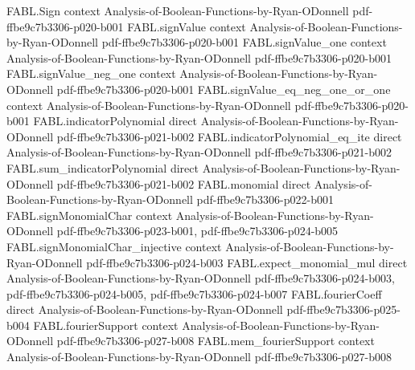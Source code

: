 \begin{theorem}
\label{FABL.fkn}
\leanok
{}
\proofstep
  {FABL.Sign}
  {context}
  {Analysis-of-Boolean-Functions-by-Ryan-ODonnell}
  {pdf-ffbe9c7b3306-p020-b001}
\proofstep
  {FABL.signValue}
  {context}
  {Analysis-of-Boolean-Functions-by-Ryan-ODonnell}
  {pdf-ffbe9c7b3306-p020-b001}
\proofstep
  {FABL.signValue_one}
  {context}
  {Analysis-of-Boolean-Functions-by-Ryan-ODonnell}
  {pdf-ffbe9c7b3306-p020-b001}
\proofstep
  {FABL.signValue_neg_one}
  {context}
  {Analysis-of-Boolean-Functions-by-Ryan-ODonnell}
  {pdf-ffbe9c7b3306-p020-b001}
\proofstep
  {FABL.signValue_eq_neg_one_or_one}
  {context}
  {Analysis-of-Boolean-Functions-by-Ryan-ODonnell}
  {pdf-ffbe9c7b3306-p020-b001}
\proofstep
  {FABL.indicatorPolynomial}
  {direct}
  {Analysis-of-Boolean-Functions-by-Ryan-ODonnell}
  {pdf-ffbe9c7b3306-p021-b002}
\proofstep
  {FABL.indicatorPolynomial_eq_ite}
  {direct}
  {Analysis-of-Boolean-Functions-by-Ryan-ODonnell}
  {pdf-ffbe9c7b3306-p021-b002}
\proofstep
  {FABL.sum_indicatorPolynomial}
  {direct}
  {Analysis-of-Boolean-Functions-by-Ryan-ODonnell}
  {pdf-ffbe9c7b3306-p021-b002}
\proofstep
  {FABL.monomial}
  {direct}
  {Analysis-of-Boolean-Functions-by-Ryan-ODonnell}
  {pdf-ffbe9c7b3306-p022-b001}
\proofstep
  {FABL.signMonomialChar}
  {context}
  {Analysis-of-Boolean-Functions-by-Ryan-ODonnell}
  {pdf-ffbe9c7b3306-p023-b001,
    pdf-ffbe9c7b3306-p024-b005}
\proofstep
  {FABL.signMonomialChar_injective}
  {context}
  {Analysis-of-Boolean-Functions-by-Ryan-ODonnell}
  {pdf-ffbe9c7b3306-p024-b003}
\proofstep
  {FABL.expect_monomial_mul}
  {direct}
  {Analysis-of-Boolean-Functions-by-Ryan-ODonnell}
  {pdf-ffbe9c7b3306-p024-b003,
    pdf-ffbe9c7b3306-p024-b005,
    pdf-ffbe9c7b3306-p024-b007}
\proofstep
  {FABL.fourierCoeff}
  {direct}
  {Analysis-of-Boolean-Functions-by-Ryan-ODonnell}
  {pdf-ffbe9c7b3306-p025-b004}
\proofstep
  {FABL.fourierSupport}
  {context}
  {Analysis-of-Boolean-Functions-by-Ryan-ODonnell}
  {pdf-ffbe9c7b3306-p027-b008}
\proofstep
  {FABL.mem_fourierSupport}
  {context}
  {Analysis-of-Boolean-Functions-by-Ryan-ODonnell}
  {pdf-ffbe9c7b3306-p027-b008}

\end{theorem}
